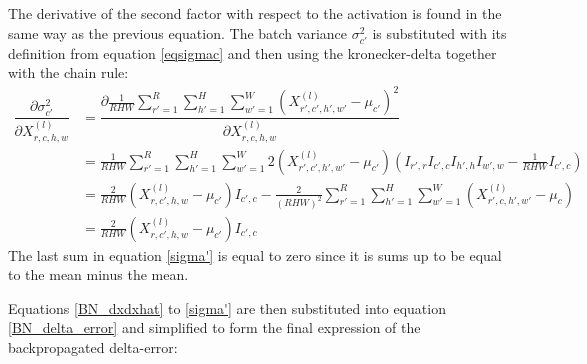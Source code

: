 \documentclass[a4paper, twoside]{article}
\newcommand*{\pd}[2]{\ensuremath{\dfrac{\partial #1}{\partial #2}}}
\begin{document}
The derivative of the second factor with respect to the activation is found in the same way as the previous equation. The batch variance $\sigma^2_{c'}$ is substituted with its definition from equation \eqref{eqsigmac} and then using the kronecker-delta together with the chain rule: \cite{webBN1} \cite{webBN2}
\begin{equation}\label{sigma'}
\begin{split}
\pd{\sigma^2_{c'}}{{X}^{(l)}_{r,c,h,w}}
	& = \pd{\frac{1}{RHW} \sum\limits^{R }_{r'=1} \sum\limits^{H }_{h'=1} \sum\limits^{W }_{w'=1} ({X^{(l)}_{r',c',h',w'} - \mu_{c'}})^2}{{X}^{(l)}_{r,c,h,w}} \\
	& = \frac{1}{RHW} \sum\limits^{R }_{r'=1} \sum\limits^{H }_{h'=1} \sum\limits^{W }_{w'=1} 2 ({X^{(l)}_{r',c',h',w'} - \mu_{c'}}) (I_{r',r} I_{c',c} I_{h',h} I_{w',w} - \frac{1}{RHW} I_{c',c}) \\
	& = \frac{2}{RHW} ({X^{(l)}_{r,c',h,w} - \mu_{c'}})I_{c',c} - \frac{2}{(RHW)^2}  \sum\limits^{R }_{r'=1} \sum\limits^{H }_{h'=1} \sum\limits^{W }_{w'=1} ({X^{(l)}_{r',c,h',w'} - \mu_{c}}) \\
	& = \frac{2}{RHW} ({X^{(l)}_{r,c',h,w} - \mu_{c'}})I_{c',c}
\end{split}
\end{equation}
The last sum in equation \eqref{sigma'} is equal to zero since it is sums up to be equal to the mean minus the mean.

Equations \eqref{BN_dxdxhat} to \eqref{sigma'} are then substituted into equation \eqref{BN_delta_error} and simplified to form the final expression of the backpropagated delta-error:
\end{document}
